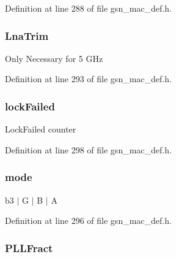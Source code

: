 Definition at line 288 of file gsn\_\-mac\_\-def.h.

\hypertarget{a00118_ae9b7edd0a8aac39749a458bbf1a52019}{
\subsubsection[{LnaTrim}]{ {\bf LnaTrim}}}
\label{a00118_ae9b7edd0a8aac39749a458bbf1a52019}
Only Necessary for 5 GHz 

Definition at line 293 of file gsn\_\-mac\_\-def.h.

\hypertarget{a00118_a93bddff7a1829758bf84927c8cd37b66}{
\subsubsection[{lockFailed}]{ {\bf lockFailed}}}
\label{a00118_a93bddff7a1829758bf84927c8cd37b66}
LockFailed counter 

Definition at line 298 of file gsn\_\-mac\_\-def.h.

\hypertarget{a00118_a7d61d79fa98a45545166420dec0d8f3d}{
\subsubsection[{mode}]{ {\bf mode}}}
\label{a00118_a7d61d79fa98a45545166420dec0d8f3d}
b3 $|$ G $|$ B $|$ A 

Definition at line 296 of file gsn\_\-mac\_\-def.h.

\hypertarget{a00118_a3b4c97c06bded5461348a682c422b324}{
\subsubsection[{PLLFract}]{ {\bf PLLFract}}}
\label{a00118_a3b4c97c06bded5461348a682c422b324}


